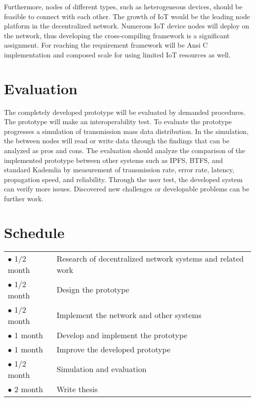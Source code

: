 \documentclass{article}
\begin{document}
Furthermore, nodes of different types, such as heterogeneous devices, should be feasible to connect with each other. The growth of IoT would be the leading node platform in the decentralized network. Numerous IoT device nodes will deploy on the network, thus developing the cross-compiling framework is a significant assignment. For reaching the requirement framework will be Ansi C implementation and composed scale for using limited IoT resources as well.


\section{Evaluation}
The completely developed prototype will be evaluated by demanded procedures. The prototype will make an interoperability test. To evaluate the prototype progresses a simulation of transmission mass data distribution. In the simulation, the between nodes will read or write data through the findings that can be analyzed as pros and cons. The evaluation should analyze the comparison of the implemented prototype between other systems such as IPFS, BTFS, and standard Kademlia by measurement of transmission rate, error rate, latency, propagation speed, and reliability. Through the user test, the developed system can verify more issues. Discovered new challenges or developable problems can be further work.

\section{Schedule}

\begin{table} [h]
	\centering
	\begin{tabular}{ p{2cm} p{13cm} }
		$\bullet$ 1/2 month & Research of decentralized network systems and related work \\
		$\bullet$ 1/2 month & Design the prototype\\
		$\bullet$ 1/2 month & Implement the network and other systems \\
		$\bullet$ 1 month & Develop and implement the prototype\\
		$\bullet$ 1 month & Improve the developed prototype\\
		$\bullet$ 1/2 month & Simulation and evaluation \\
		$\bullet$ 2 month & Write thesis \\
	\end{tabular}
\end{table}

\newpage



\end{document}
